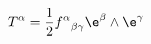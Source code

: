 \begin{equation}
T^\alpha = {1\over 2}{f^\alpha}_{\beta\gamma}\e^\beta\wedge\e^\gamma
\end{equation}

